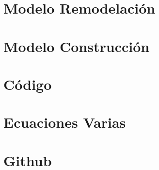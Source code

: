 \documentclass[pdftex]{pucthesis}	%
\begin{document}
\chapter{Modelo Remodelación}\label{app:Remodelación}


\chapter{Modelo Construcción}\label{app:Construcción}


\chapter{Código}\label{app:código}


\chapter{Ecuaciones Varias}\label{app:eq}


\chapter{Github}\label{app:Github}

\end{document}
